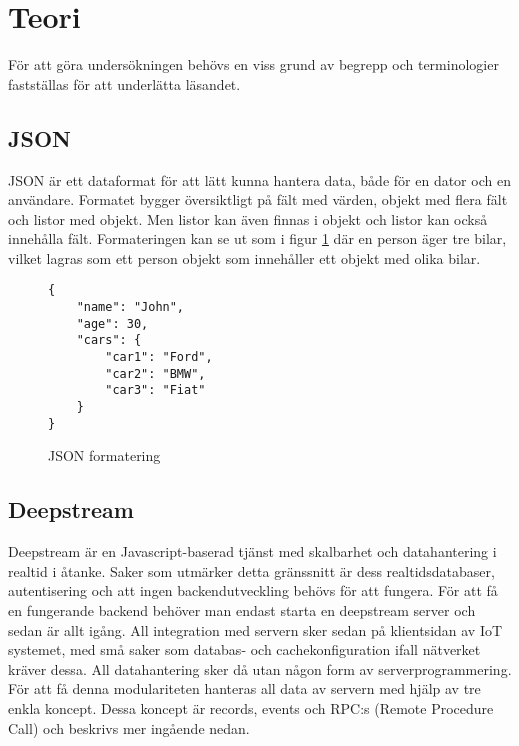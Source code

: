 \section{Teori}

\label{sec:tim-theory}
För att göra undersökningen behövs en viss grund av begrepp och terminologier fastställas för att underlätta läsandet.

\subsection{JSON}
JSON\cite{json} är ett dataformat för att lätt kunna hantera data, både för en dator och en användare. Formatet bygger översiktligt på fält med värden, objekt med flera fält och listor med objekt. Men listor kan även finnas i objekt och listor kan också innehålla fält. Formateringen kan se ut som i figur \ref{fig:tim-jsonformat} där en person äger tre bilar, vilket lagras som ett person objekt som innehåller ett objekt med olika bilar.

\lstset{language=Java}
\begin{figure}[h]
  \begin{minipage}[c]{5cm}
    \begin{lstlisting}
{
    "name": "John",
    "age": 30,
    "cars": {
        "car1": "Ford",
        "car2": "BMW",
        "car3": "Fiat"
    }
} 
    \end{lstlisting}
  \caption{JSON formatering}
  \label{fig:tim-jsonformat}
  \end{minipage}
\end{figure}

\subsection{Deepstream}
\label{subsec:tim-deepstream}
Deepstream är en Javascript-baserad tjänst med skalbarhet och datahantering i realtid i åtanke. Saker som utmärker detta gränssnitt är dess realtidsdatabaser, autentisering och att ingen backendutveckling behövs för att fungera. För att få en fungerande backend behöver man endast starta en deepstream server och sedan är allt igång. All integration med servern sker sedan på klientsidan av IoT systemet, med små saker som databas- och cachekonfiguration ifall nätverket kräver dessa. All datahantering sker då utan någon form av serverprogrammering. För att få denna modulariteten hanteras all data av servern med hjälp av tre enkla koncept. Dessa koncept är records, events och RPC:s (Remote Procedure Call) och beskrivs mer ingående nedan. 


